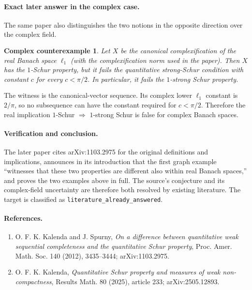 \documentclass[11pt]{article}
\newtheorem*{answerB}{Complex counterexample}
\begin{document}
\paragraph{Exact later answer in the complex case.}
The same paper also distinguishes the two notions in the opposite direction
over the complex field.
\begin{answerB}
Let $X$ be the canonical complexification of the real Banach space $\ell_1$
(with the complexification norm used in the paper).  Then $X$ has the
$1$-Schur property, but it fails the quantitative strong-Schur condition with
constant $c$ for every $c<\pi/2$.  In particular, it fails the $1$-strong
Schur property.
\end{answerB}
The witness is the canonical-vector sequence.  Its complex lower
$\ell_1$ constant is $2/\pi$, so no subsequence can have the constant required
for $c<\pi/2$.  Therefore the real implication
$1$-Schur $\Rightarrow$ $1$-strong Schur is false for complex Banach spaces.

\paragraph{Verification and conclusion.}
The later paper cites arXiv:1103.2975 for the original definitions and
implications, announces in its introduction that the first graph example
``witnesses that these two properties are different also within real Banach
spaces,'' and proves the two examples above in full.  The source's conjecture
and its complex-field uncertainty are therefore both resolved by existing
literature.  The target is classified as
\texttt{literature\_already\_answered}.

\paragraph{References.}
\begin{enumerate}
\item O. F. K. Kalenda and J. Spurny, \emph{On a difference between
quantitative weak sequential completeness and the quantitative Schur
property}, Proc. Amer. Math. Soc. 140 (2012), 3435--3444;
arXiv:1103.2975.
\item O. F. K. Kalenda, \emph{Quantitative Schur property and measures of weak
non-compactness}, Results Math. 80 (2025), article 233;
arXiv:2505.12893.
\end{enumerate}
\end{document}
